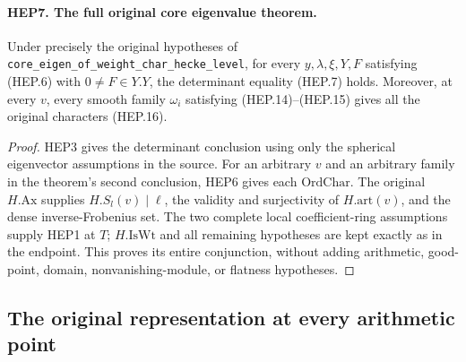 \documentclass[11pt,a4paper]{article}
\numberwithin{equation}{section}
\theoremstyle{remark}\newtheorem{remark}[theorem]{Remark}
\begin{document}
\paragraph{HEP7. The full original core eigenvalue theorem.}
\label{claim:HEP7}
Under precisely the original hypotheses of
\texttt{core\_\allowbreak eigen\_\allowbreak of\_\allowbreak weight\_\allowbreak char\_\allowbreak hecke\_\allowbreak level}, for every
$y,\lambda,\xi,Y,F$ satisfying (HEP.6) with $0\ne F\in Y.Y$,
the determinant equality (HEP.7) holds.  Moreover, at every $v$,
every smooth family $\omega_i$ satisfying (HEP.14)--(HEP.15)
gives all the original characters (HEP.16).
\begin{proof}
HEP3 gives the determinant conclusion using only the spherical
eigenvector assumptions in the source.  For an arbitrary $v$ and
an arbitrary family in the theorem's second conclusion, HEP6
gives each $\mathrm{OrdChar}$.  The original
$H.\mathrm{Ax}$ supplies $H.S_l(v)\mid\ell$, the validity and
surjectivity of $H.\mathrm{art}(v)$, and the dense inverse-Frobenius
set.  The two complete local coefficient-ring assumptions supply
HEP1 at $T$; $H.\mathrm{IsWt}$ and all remaining hypotheses are
kept exactly as in the endpoint.  This proves its entire
conjunction, without adding arithmetic, good-point, domain,
nonvanishing-module, or flatness hypotheses.
\end{proof}

\subsection{The original representation at every arithmetic point}

\end{document}
